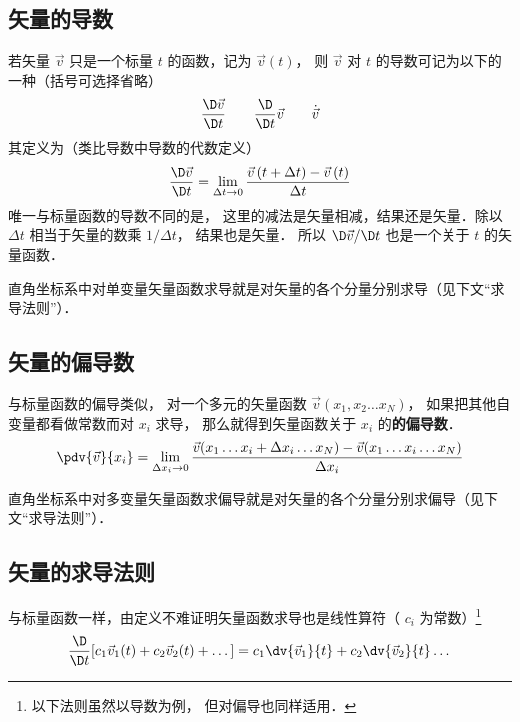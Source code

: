 

\subsection{矢量的导数}

若矢量 $\vec v$ 只是一个标量 $t$ 的函数，记为 $\vec v(t)$， 则 $\vec v$ 对 $t$ 的导数可记为以下的一种（括号可选择省略）
\begin{equation}
\frac{\D\vec v}{\D t} \qquad \frac{\D}{\D t}\vec v \qquad \dot{\vec v}
\end{equation}
其定义为（类比导数中导数的代数定义）
\begin{equation}
\frac{{\D\vec v}}{{\D t}} = \mathop {\lim }\limits_{\Delta t \to 0} \frac{{\vec v\left( {t + \Delta t} \right) - \vec v\left( t \right)}}{{\Delta t}}
\end{equation}
唯一与标量函数的导数不同的是， 这里的减法是矢量相减，结果还是矢量．除以 $\Delta t$ 相当于矢量的数乘 $1/\Delta t$， 结果也是矢量． 所以 $\D\vec v / \D t$ 也是一个关于 $t$ 的矢量函数．

直角坐标系中对单变量矢量函数求导就是对矢量的各个分量分别求导（见下文“求导法则”）．

\subsection{矢量的偏导数}
与标量函数的偏导类似， 对一个多元的矢量函数 $\vec v(x_1, x_2\ldots x_N)$， 如果把其他自变量都看做常数而对 $x_i$ 求导， 那么就得到矢量函数关于 $x_i$ 的\textbf{的偏导数}．
\begin{equation}
\pdv{\vec v}{x_i} = \lim_{\Delta x_i \to 0} \frac{\vec v(x_1 \ldots x_i+\Delta x_i\ldots x_N) -  \vec v(x_1 \ldots x_i\ldots x_N)}{\Delta x_i}
\end{equation}

直角坐标系中对多变量矢量函数求偏导就是对矢量的各个分量分别求偏导（见下文“求导法则”）．

\subsection{矢量的求导法则}
与标量函数一样，由定义不难证明矢量函数求导也是线性算符（ $c_i$ 为常数）\footnote{以下法则虽然以导数为例， 但对偏导也同样适用．}
\begin{equation}
\frac{\D}{{\D t}}[{c_1}{\vec v_1}(t) + {c_2}{\vec v_2}(t) + \dots] = {c_1}\dv{\vec v_1}{t} + c_2\dv{\vec v_2}{t} \dots
\end{equation}

